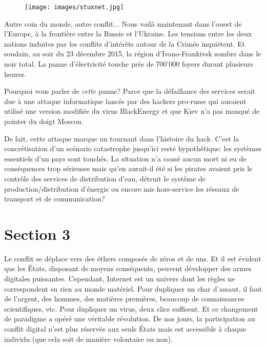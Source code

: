 \documentclass[article]{yReport}
\begin{document}
	\begin{figure}[ht!]
		\texttt{[image: images/stuxnet.jpg]}
		\label{fig:stuxnet}
	\end{figure}
	
	Autre coin du monde, autre conflit...
	Nous voilà maintenant dans l'ouest de l'Europe, à la frontière entre la Russie et l'Ukraine.
	Les tensions entre les deux nations induites par les conflits d'intérêts autour de la Crimée inquiètent.
	Et soudain, au soir du 23 décembre 2015, la région d'Ivano-Frankivsk sombre dans le noir total.
	La panne d'électricité touche près de 700'000 foyers durant plusieurs heures.
	
	Pourquoi vous parler de \textit{cette} panne? Parce que la défaillance des services serait due à une attaque informatique lancée par des hackers pro-russe qui auraient utilisé une version modifiée du virus BlackEnergy et que Kiev n'a pas manqué de pointer du doigt Moscou.
	
	De fait, cette attaque marque un tournant dans l'histoire du hack.
	C'est la concrétisation d'un scénario catastrophe jusqu'ici resté hypothétique: les systèmes essentiels d'un pays sont touchés.
	La situation n'a causé aucun mort ni eu de conséquences trop sérieuses mais qu'en aurait-il été si les pirates avaient pris le contrôle des services de distribution d'eau, détruit le système de production/distribution d'énergie ou encore mis hors-service les réseaux de transport et de communication?
	
	
	\section{Section 3}
	Le conflit se déplace vers des éthers composés de zéros et de uns.
	Et il est évident que les États, disposant de moyens conséquents, peuvent développer des armes digitales puissantes.
	Cependant, Internet est un univers dont les règles ne correspondent en rien au monde matériel.
	Pour dupliquer un char d'assaut, il faut de l'argent, des hommes, des matières premières, beaucoup de connaissances scientifiques, etc.
	Pour dupliquer un virus, deux clics suffisent.
	Et ce changement de paradigme a opéré une véritable révolution.
	De nos jours, la participation au conflit digital n'est plus réservée aux seuls États mais est accessible à chaque individu (que cela soit de manière volontaire ou non).
	
\end{document}
